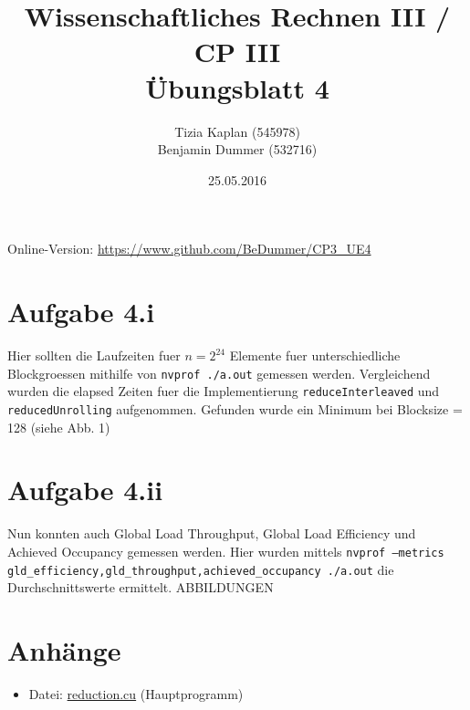 \documentclass[%
	paper=A4,	%
	pagesize,	%
	DIV=calc,	%
	smallheadings,	%
	ngerman		%
]{scrartcl}
\title{{\bf Wissenschaftliches Rechnen III / CP III}\\Übungsblatt 4}
\author{Tizia Kaplan (545978)\\Benjamin Dummer (532716)}
\date{25.05.2016}
\begin{document}
\maketitle
Online-Version: \href{https://www.github.com/BeDummer/CP3_UE4}{\url{https://www.github.com/BeDummer/CP3_UE4}}

\section*{Aufgabe 4.i}
Hier sollten die Laufzeiten fuer $n=2^24$ Elemente fuer unterschiedliche Blockgroessen mithilfe von \texttt{nvprof ./a.out} gemessen werden. Vergleichend wurden die elapsed Zeiten fuer die Implementierung \texttt{reduceInterleaved} und \texttt{reducedUnrolling} aufgenommen. Gefunden wurde ein Minimum bei Blocksize = 128 (siehe Abb. 1) 

\section*{Aufgabe 4.ii}
Nun konnten auch Global Load Throughput, Global Load Efficiency und Achieved Occupancy gemessen werden. Hier wurden mittels \texttt{nvprof --metrics gld_efficiency,gld_throughput,achieved_occupancy ./a.out} die Durchschnittswerte ermittelt.
ABBILDUNGEN

\section*{Anhänge}
\begin{itemize}
	\item Datei: \url{reduction.cu} (Hauptprogramm)
\end{itemize}
\end{document}
